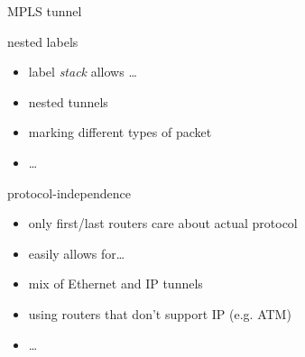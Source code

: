 \begin{frame}[fragile]{MPLS tunnel}
\end{frame}

\begin{frame}{nested labels}
    \begin{itemize}
    \item label \textit{stack} allows \ldots
    \item nested tunnels
    \item marking different types of packet
    \item \ldots
    \end{itemize}
\end{frame}

\begin{frame}{protocol-independence}
    \begin{itemize}
    \item only first/last routers care about actual protocol
    \item easily allows for\ldots
    \vspace{.5cm}
    \item mix of Ethernet and IP tunnels
    \item using routers that don't support IP (e.g. ATM)
    \item \ldots
    \end{itemize}
\end{frame}
